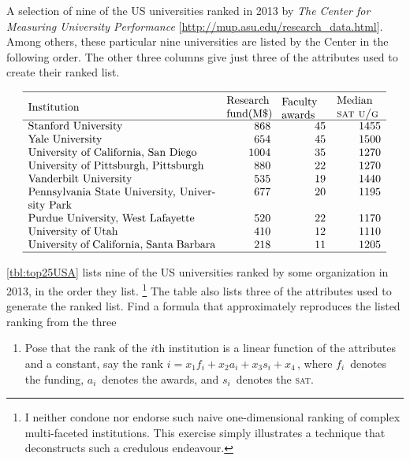 \begin{exercise} \label{ex:top25USA} 
\begin{table}
\caption{A selection of nine of the US universities ranked in 2013 by \emph{The Center for Measuring University Performance} [\url{http://mup.asu.edu/research_data.html}].  
Among others, these particular nine universities are listed by the Center in the following order.  
The other three columns give just three of the attributes used to create their ranked list.}
\label{tbl:top25USA}
\begin{equation*}
\begin{array}{p{17em}rrr}
\hline \vphantom{\Huge I}%
Institution& 
\parbox{4em}{\raggedright Research fund(M\$)}& 
\parbox{4em}{\raggedright Faculty awards} & 
\parbox{4em}{\raggedright Median \textsc{sat u/g}}\\
\hline
Stanford University&868&45&1455\\
Yale University&654&45&1500\\
University of California, San Diego&1004&35&1270\\
University of Pittsburgh, Pittsburgh&880&22&1270\\
Vanderbilt University&535&19&1440\\
Pennsylvania State University, University Park&677&20&1195\\
Purdue University, West Lafayette&520&22&1170\\
University of Utah&410&12&1110\\
University of California, Santa Barbara&218&11&1205\\
\hline
\end{array}
\end{equation*}
\end{table}%
\cref{tbl:top25USA} lists nine of the US universities ranked by some organization in 2013, in the order they list.%
\footnote{I neither condone nor endorse such naive one-dimensional ranking of complex multi-faceted institutions.  
This exercise simply illustrates a technique that deconstructs such a credulous endeavour.}
The table also lists three of the attributes used to generate the ranked list.
Find a formula that approximately reproduces the listed ranking from the three 
\begin{enumerate}
\item Pose that the rank of the \(i\)th institution is a linear function of the attributes and a constant, say the rank \(i=x_1f_i+x_2a_i+x_3s_i+x_4\)\,, where \(f_i\)~denotes the funding, \(a_i\)~denotes the awards, and \(s_i\)~denotes the \textsc{sat}.

\end{enumerate}
\end{exercise}
